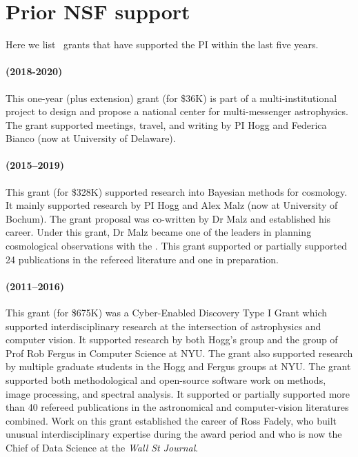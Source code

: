 \documentclass[12pt, fullpage, letterpaper]{article}
\begin{document}
\section{Prior NSF support}

Here we list \NSF\ grants that have supported the PI within the last five years.

\paragraph{
 (2018-2020)}
This one-year (plus extension) grant (for \$36K) is part of a multi-institutional project
to design and propose a national center for multi-messenger astrophysics. The grant supported
meetings, travel, and writing by PI Hogg and Federica Bianco (now at University of Delaware).

\paragraph{
(2015--2019)} This grant (for \$328K) supported research into Bayesian
methods for cosmology. It mainly supported research by PI Hogg and
Alex Malz (now at University of Bochum). The grant proposal was co-written
by Dr Malz and established his career.
Under this grant, Dr Malz became one of the leaders in planning cosmological
observations with the .
This grant supported or partially supported 24 publications
in the refereed literature and one in preparation.

\paragraph{
 (2011--2016)}
This grant (for \$675K) was a Cyber-Enabled Discovery Type I Grant
which supported interdisciplinary research at the intersection of
astrophysics and computer vision.  It supported research by both
Hogg's group and the group of Prof Rob Fergus in Computer Science at
NYU.
The grant also supported research by multiple graduate students in the
Hogg and Fergus groups at NYU.
The grant supported both methodological and open-source software work
on  methods, image processing, and spectral analysis.
It supported or partially supported
more than 40 refereed publications in the astronomical and
computer-vision literatures combined.
Work on this grant established the career of Ross Fadely, who built unusual
interdisciplinary expertise during the award period and who is now the
Chief of Data Science at the \textit{Wall St Journal}.
\end{document}
